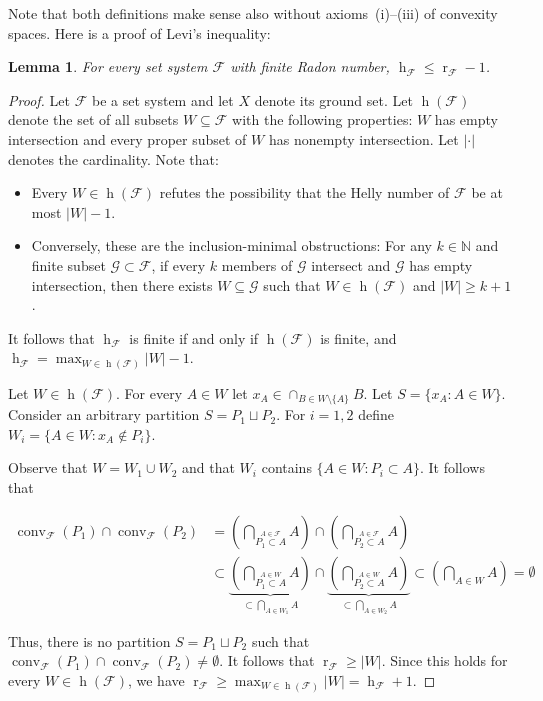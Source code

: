 \documentclass[a4paper,UKenglish,thm-restate]{article}
\newcommand{\N}{\mathbb{N}}
\newcommand{\F}{\mathcal{F}}
\newcommand{\G}{\mathcal{G}}
\DeclareMathOperator{\h}{h}
\DeclareMathOperator{\conv}{conv}
\DeclareMathOperator{\rad}{r}
\newcommand{\pth}[1]{\left(#1\right)}
\newtheorem{lemma}{Lemma}[section]
\begin{document}
\noindent
Note that both definitions make sense also without axioms~(i)--(iii) of convexity spaces. Here is a proof of Levi's inequality:

\begin{lemma}
  For every set system $\F$ with finite Radon number, $\h_\F \le \rad_\F-1$.
\end{lemma}
\begin{proof}
  Let $\F$ be a set system and let $X$ denote its ground set. Let $\h(\F)$ denote the set of all subsets $W \subseteq \F$ with the following properties: $W$ has empty intersection and every proper subset of $W$ has nonempty intersection. Let $|\cdot|$ denotes the cardinality. Note that:

  \begin{itemize}
  \item Every $W \in \h(\F)$ refutes the possibility that the Helly number of $\F$ be at most $|W|-1$.\medskip
    
  \item Conversely, these are the inclusion-minimal obstructions: For any $k \in \N$ and finite subset $\G \subset\F$, if every $k$ members of $\G$ intersect and $\G$ has empty intersection, then there exists $W \subseteq \G$ such that $W \in \h(\F)$ and $|W| \ge k+1$.\medskip
  \end{itemize}

  \noindent
  It follows that $\h_\F$ is finite if and only if $\h(\F)$ is finite, and $\h_\F = \max_{W \in \h(\F)} |W| - 1$.
  
  \medskip

  Let $W \in \h(\F)$. For every $A \in W$ let $x_A \in \cap_{B \in W\setminus\{A\}} B$. Let $S = \{x_A \colon A \in W\}$. Consider an arbitrary partition $S=P_1\sqcup P_2$. 
  For $i=1,2$ define $W_i = \{A \in W \colon x_A \notin P_i\}$. 

  Observe that $W = W_1 \cup W_2$ and that $W_i$ contains $\{A \in W \colon P_i \subset A\}$. It follows that

  \[\begin{aligned}
  \conv_{\F}(P_1) \cap \conv_{\F}(P_2) & = \pth{\bigcap_{\stackrel{A \in \F}{P_1 \subset A}}A} \cap \pth{\bigcap_{\stackrel{A \in \F}{P_2 \subset A}}A}\\
  & \subset \underbrace{\pth{\bigcap_{\stackrel{A \in W}{P_1 \subset A}}A}}_{\subset\bigcap_{A \in W_1}A} \cap \underbrace{\pth{\bigcap_{\stackrel{A \in W}{P_2 \subset A}}A}}_{\subset\bigcap_{A \in W_2}A} \subset \pth{\bigcap_{A \in W}A} = \emptyset
  \end{aligned}\]

  \noindent
  Thus, there is no partition $S=P_1\sqcup P_2$ such that $\conv_{\F}(P_1) \cap \conv_{\F}(P_2) \neq \emptyset$. It follows that $\rad_\F \ge |W|$. Since this holds for every $W \in \h(\F)$, we have $\rad_\F \ge \max_{W \in \h(\F)}|W| = \h_\F+1$.
\end{proof}
\end{document}
